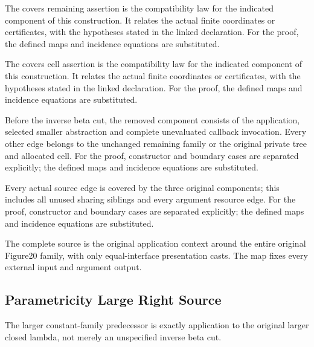 The covers remaining assertion is the compatibility law for the indicated component of this construction. It relates the actual finite coordinates or certificates, with the hypotheses stated in the linked declaration.
For the proof, the defined maps and incidence equations are substituted.
\par{}

The covers cell assertion is the compatibility law for the indicated component of this construction. It relates the actual finite coordinates or certificates, with the hypotheses stated in the linked declaration.
For the proof, the defined maps and incidence equations are substituted.
\par{}

Before the inverse beta cut, the removed component consists of the application, selected smaller abstraction and complete unevaluated callback invocation. Every other edge belongs to the unchanged remaining family or the original private tree and allocated cell.
For the proof, constructor and boundary cases are separated explicitly; the defined maps and incidence equations are substituted.
\par{}

Every actual source edge is covered by the three original components; this includes all unused sharing siblings and every argument resource edge.
For the proof, constructor and boundary cases are separated explicitly; the defined maps and incidence equations are substituted.
\par{}

The complete source is the original application context around the entire original Figure20 family, with only equal-interface presentation casts. The map fixes every external input and argument output.
\par{}

\subsection{Parametricity Large Right Source}
The larger constant-family predecessor is exactly application to the original larger closed lambda, not merely an unspecified inverse beta cut.

